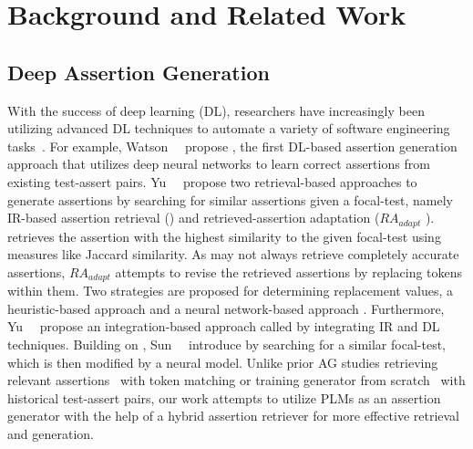 \section{Background and Related Work}
\label{sec:background}
\subsection{Deep Assertion Generation}
\label{sec:background_AG}



With the success of deep learning (DL), researchers have increasingly been utilizing advanced DL techniques to automate a variety of software engineering tasks~\cite{watson2022systematic,yang2022survey,zhang2023survey}.
For example, Watson~\etal~\cite{watson2020learning} propose \atla{}, the first DL-based assertion generation approach that utilizes deep neural networks to learn correct assertions from existing test-assert pairs.
Yu~\etal~\cite{yu2022automated} propose two retrieval-based approaches to generate assertions by searching for similar assertions given a focal-test, namely IR-based assertion retrieval (\irar{}) and retrieved-assertion adaptation ($RA_{adapt}$ ).
\irar{} retrieves the assertion with the highest similarity to the given focal-test using measures like Jaccard similarity.
As \irar{} may not always retrieve completely accurate assertions, $RA_{adapt}$ attempts to revise the retrieved assertions by replacing tokens within them.
Two strategies are proposed for determining replacement values, \ie a heuristic-based approach \rah{} and a neural network-based approach \rann{}.
Furthermore, Yu~\etal~\cite{yu2022automated} propose an integration-based approach called \inte{} by integrating IR and DL techniques.
Building on \inte{}, Sun~\etal~\cite{sun2023revisiting} introduce \edit{} by searching for a similar focal-test, which is then modified by a neural model.
Unlike prior AG studies retrieving relevant assertions~\cite{yu2022automated} with token matching or training generator from scratch~\cite{watson2020learning} with historical test-assert pairs, our work attempts to utilize PLMs as an assertion generator with the help of a hybrid assertion retriever for more effective retrieval and generation.

